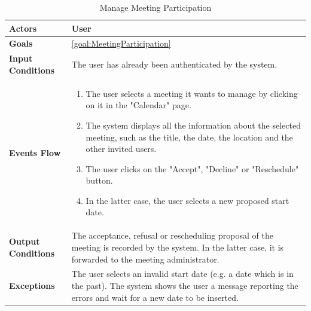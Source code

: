 \begin{table}[H]
	\centering
	\def\arraystretch{1.5}
	\begin{tabular}{|p{7cm}|p{7cm}|}
		\hline
		\textbf{Actors}            & User		    \\ \hline
		\textbf{Goals}             & \ref{goal:MeetingParticipation}           \\ \hline
		\textbf{Input Conditions}  & The user has already been authenticated by the system.           \\ \hline
		\textbf{Events Flow}       & 
			\begin{enumerate}[topsep=0pt, leftmargin=*]
				\item The user selects a meeting it wants to manage by clicking on it in the "Calendar" page.
				\item The system displays all the information about the selected meeting, such as the title, the date, the location and the other invited users.
				\item The user clicks on the "Accept", "Decline" or "Reschedule" button.
				\item In the latter case, the user selects a new proposed start date.
			\end{enumerate}           \\ \hline
		\textbf{Output Conditions} & The acceptance, refusal or rescheduling proposal of the meeting is recorded by the system. In the latter case, it is forwarded to the meeting administrator.           \\ \hline
		\textbf{Exceptions}        & The user selects an invalid start date (e.g. a date which is in the past). The system shows the user a message reporting the errors and wait for a new date to be inserted.           \\ \hline
	\end{tabular}
	\caption{Manage Meeting Participation}
\end{table}

